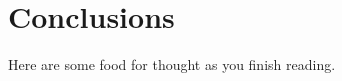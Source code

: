 \documentclass[ProjectMMD]{subfiles}
\begin{document}
\hypertarget{Conclusions}{}
\section{Conclusions}

Here are some food for thought as you finish reading.





\onlyinsubfile{}
%
\end{document}
